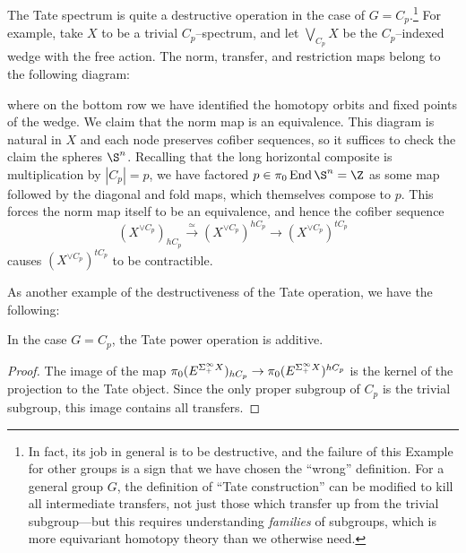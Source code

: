 \begin{example}\label{TateDestruction}
The Tate spectrum is quite a destructive operation in the case of \(G = C_p\).\footnote{In fact, its job in general is to be destructive, and the failure of this Example for other groups is a sign that we have chosen the ``wrong'' definition. For a general group \(G\), the definition of ``Tate construction'' can be modified to kill all intermediate transfers, not just those which transfer up from the trivial subgroup---but this requires understanding \textit{families} of subgroups, which is more equivariant homotopy theory than we otherwise need.}  For example, take \(X\) to be a trivial \(C_p\)--spectrum, and let \(\bigvee_{C_p} X\) be the \(C_p\)--indexed wedge with the free action.  The norm, transfer, and restriction maps belong to the following diagram:
\begin{center}
\end{center}
where on the bottom row we have identified the homotopy orbits and fixed points of the wedge.  We claim that the norm map is an equivalence.  This diagram is natural in \(X\) and each node preserves cofiber sequences, so it suffices to check the claim the spheres \(\S^n\).  Recalling that the long horizontal composite is multiplication by \(|C_p| = p\), we have factored \(p \in \pi_0 \End \S^n = \Z\) as some map followed by the diagonal and fold maps, which themselves compose to \(p\).  This forces the norm map itself to be an equivalence, and hence the cofiber sequence \[(X^{\vee C_p})_{hC_p} \xrightarrow{\simeq} (X^{\vee C_p})^{hC_p} \to (X^{\vee C_p})^{tC_p}\] causes \((X^{\vee C_p})^{tC_p}\) to be contractible.
\end{example}

As another example of the destructiveness of the Tate operation, we have the following:

\begin{lemma}
In the case \(G = C_p\), the Tate power operation is additive.
\end{lemma}
\begin{proof}
The image of the map \(\pi_0 (E^{\Sigma^\infty_+ X})_{hC_p} \to \pi_0 (E^{\Sigma^\infty_+ X})^{hC_p}\) is the kernel of the projection to the Tate object.  Since the only proper subgroup of \(C_p\) is the trivial subgroup, this image contains all transfers.
\end{proof}

